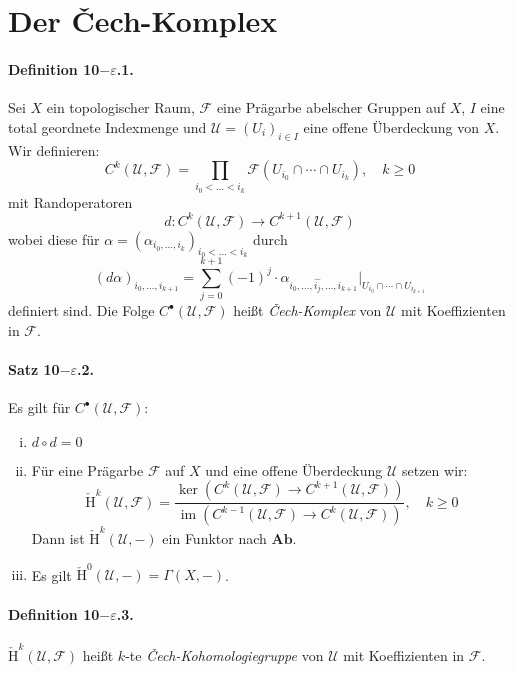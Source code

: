 \section{Der Čech-Komplex}

\paragraph{Definition 10$-\varepsilon$.1.}\label{9.5.1} Sei $X$ ein topologischer Raum, $\mathcal{F}$ eine Prägarbe abelscher Gruppen auf $X$, $I$ eine total geordnete Indexmenge und $\mathcal{U}=(U_i)_{i\in I}$ eine offene Überdeckung von $X$. Wir definieren:
\[C^k(\mathcal{U},\mathcal{F})=\prod_{i_0<\ldots<i_k}\mathcal{F}(U_{i_0}\cap\cdots\cap U_{i_k}),\quad k\geq 0 \]
mit Randoperatoren
\[d: C^k(\mathcal{U},\mathcal{F})\to C^{k+1}(\mathcal{U},\mathcal{F}) \]
wobei diese für $\alpha=(\alpha_{i_0,\ldots,i_k})_{i_0<\ldots<i_k}$ durch
\[(d\alpha)_{i_0,\ldots,i_{k+1}} = \sum_{j=0}^{k+1} (-1)^j \cdot\alpha_{i_0,\ldots,\widehat{i_j},\ldots,i_{k+1}}|_{U_{i_0}\cap\cdots\cap U_{i_{k+1}}} \]
definiert sind. Die Folge $C^\bullet(\mathcal{U},\mathcal{F})$ heißt \textit{Čech-Komplex} von $\mathcal{U}$ mit Koeffizienten in $\mathcal{F}$.

\paragraph{Satz 10$-\varepsilon$.2.}\label{9.5.2} Es gilt für $C^\bullet(\mathcal{U},\mathcal{F})$:
\begin{enumerate}[(i)]
\item $d\circ d =0$
\item Für eine Prägarbe $\mathcal{F}$ auf $X$ und eine offene Überdeckung $\mathcal{U}$ setzen wir:
\[\check{\mathrm{H}}^k(\mathcal{U},\mathcal{F}) = \frac{\ker( C^k(\mathcal{U},\mathcal{F})\to C^{k+1}(\mathcal{U},\mathcal{F}) )}{\operatorname{im}(C^{k-1}(\mathcal{U},\mathcal{F})\to C^{k}(\mathcal{U},\mathcal{F}))},\quad k\geq 0 \]
Dann ist $\check{\mathrm{H}}^k(\mathcal{U},-)$ ein Funktor nach $\mathbf{Ab}$.
\item Es gilt $\check{\mathrm{H} }^0(\mathcal{U},-)=\Gamma(X,-)$.
\end{enumerate}

\paragraph{Definition 10$-\varepsilon$.3.}\label{9.5.3} $\check{\mathrm{H}}^k(\mathcal{U},\mathcal{F})$ heißt $k$-te \textit{Čech-Kohomologiegruppe} von $\mathcal{U}$ mit Koeffizienten in $\mathcal{F}$.

